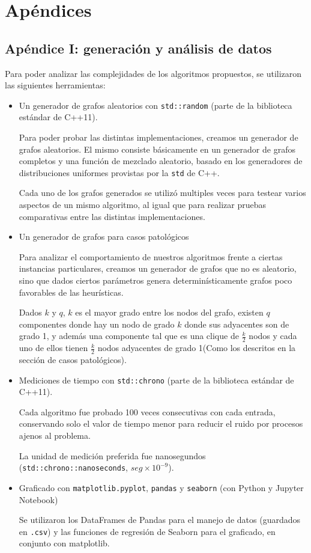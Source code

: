 \section{Apéndices}
	\subsection{Apéndice I: generación y análisis de datos}

	Para poder analizar las complejidades de los algoritmos propuestos, se utilizaron las siguientes herramientas:

	\begin{itemize}
		\item Un generador de grafos aleatorios con \texttt{std::random} (parte de la biblioteca estándar de C++11).

		Para poder probar las distintas implementaciones, creamos un generador de grafos aleatorios. El mismo consiste básicamente en un generador de grafos completos y una función de mezclado aleatorio, basado en los generadores de distribuciones uniformes provistas por la \texttt{std} de C++.

		Cada uno de los grafos generados se utilizó multiples veces para testear varios aspectos de un mismo algoritmo, al igual que para realizar pruebas comparativas entre las distintas implementaciones.

		\item Un generador de grafos para casos patológicos

		Para analizar el comportamiento de nuestros algoritmos frente a ciertas instancias particulares, creamos un generador de grafos que no es aleatorio, sino que dados ciertos parámetros genera determinísticamente grafos poco favorables de las heurísticas.

		Dados $k$ y $q$, $k$ es el mayor grado entre los nodos del grafo, existen $q$ componentes donde hay un nodo de grado $k$ donde sus adyacentes son de grado 1, y además una componente tal que es una clique de $\frac{k}{2}$ nodos y cada uno de ellos tienen $\frac{k}{2}$ nodos adyacentes de grado 1(Como los descritos en la sección de casos patológicos).

		\item Mediciones de tiempo con \texttt{std::chrono} (parte de la biblioteca estándar de C++11).

		Cada algoritmo fue probado 100 veces consecutivas con cada entrada, conservando solo el valor de tiempo menor para reducir el ruido por procesos ajenos al problema.

		La unidad de medición preferida fue nanosegundos (\texttt{std::chrono::nanoseconds}, $seg \times 10^{-9}$).

		\item Graficado con \texttt{matplotlib.pyplot}, \texttt{pandas} y \texttt{seaborn} (con Python y Jupyter Notebook)

		Se utilizaron los DataFrames de Pandas para el manejo de datos (guardados en \texttt{.csv}) y las funciones de regresión de Seaborn para el graficado, en conjunto con matplotlib.

	\end{itemize}

